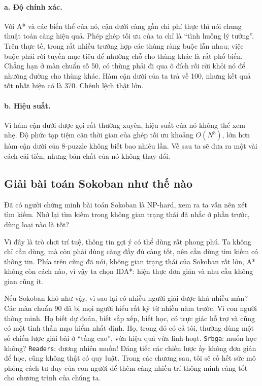 \documentclass[11pt]{article}
\begin{document}
\paragraph{a. Độ chính xác.}
Với A* và các biến thể của nó, cận dưới càng gần chi phí thực thì nói chung
thuật toán càng hiệu quả. Phép ghép tối ưu của ta chỉ là ``tình huống lý
tưởng''. Trên thực tế, trong rất nhiều trường hợp các thùng ràng buộc lẫn
nhau; việc buộc phải rời tuyến mục tiêu để nhường chỗ cho thùng khác là rất
phổ biến. Chẳng hạn ở màn chuẩn số 50, có thùng phải đi qua ô đích rồi rời
khỏi nó để nhường đường cho thùng khác. Hàm cận dưới của ta trả về 100, nhưng
kết quả tốt nhất hiện có là 370. Chênh lệch thật lớn.

\paragraph{b. Hiệu suất.}
Vì hàm cận dưới được gọi rất thường xuyên, hiệu suất của nó không thể xem
nhẹ. Độ phức tạp tiệm cận thời gian của ghép tối ưu khoảng \(O(N^3)\), lớn
hơn hàm cận dưới của 8-puzzle không biết bao nhiêu lần. Về sau ta sẽ đưa ra
một vài cách cải tiến, nhưng bản chất của nó không thay đổi.

\subsection{Giải bài toán Sokoban như thế nào}

Đã có người chứng minh bài toán Sokoban là NP-hard, xem ra ta vẫn nên xét
tìm kiếm. Nhớ lại tìm kiếm trong không gian trạng thái đã nhắc ở phần trước,
dùng loại nào là tốt?

Vì đây là trò chơi trí tuệ, thông tin gợi ý có thể dùng rất phong phú. Ta
không chỉ cần dùng, mà còn phải dùng càng đầy đủ càng tốt, nên cần dùng tìm
kiếm có thông tin. Phía trên cũng đã nói, không gian trạng thái của Sokoban
rất lớn, A* không còn cách nào, vì vậy ta chọn IDA*: hiện thực đơn giản và
nhu cầu không gian cũng ít.

Nếu Sokoban khó như vậy, vì sao lại có nhiều người giải được khá nhiều màn?
Các màn chuẩn 90 đã bị mọi người hiểu rất kỹ từ nhiều năm trước. Vì con người
thông minh. Họ biết dự đoán, biết sắp xếp, biết học, có trực giác hỗ trợ và
cũng có một tinh thần mạo hiểm nhất định. Họ, trong đó có cả tôi, thường dùng
một số chiến lược giải bài ở ``tầng cao'', vừa hiệu quả vừa linh hoạt.
\texttt{Srbga}: muốn học không? \texttt{Readers}: đương nhiên muốn! Đáng tiếc
các chiến lược ấy không đơn giản để học, cũng không thật có quy luật. Trong
các chương sau, tôi sẽ cố hết sức mô phỏng cách tư duy của con người để thêm
càng nhiều trí thông minh càng tốt cho chương trình của chúng ta.
\end{document}
